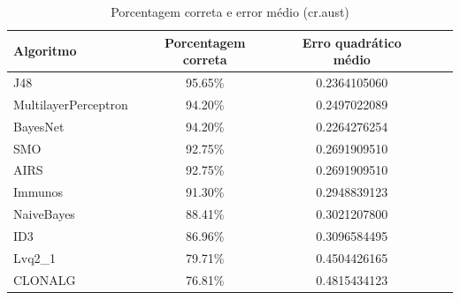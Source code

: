 \begin{table}[h]
    \centering
    \caption{Porcentagem correta e error médio (cr.aust)}
    \label{tbl:dev_table_aust_correct}
    \label{tbl:dev_table_first}
    \vspace{0.5cm}
    \begin{tabular}{|l|c|c|c|c|}
        \hline
        \textbf{Algoritmo} & \textbf{Porcentagem correta} & \textbf{Erro quadrático médio} \\
        \hline
        \rowcolor[gray]{.9}
        J48                  & 95.65\% & 0.2364105060 \\ \hline
        \rowcolor[gray]{.9}
        MultilayerPerceptron & 94.20\% & 0.2497022089 \\ \hline
        \rowcolor[gray]{.9}
        BayesNet             & 94.20\% & 0.2264276254 \\ \hline
        SMO                  & 92.75\% & 0.2691909510 \\ \hline
        AIRS                 & 92.75\% & 0.2691909510 \\ \hline
        Immunos              & 91.30\% & 0.2948839123 \\ \hline
        NaiveBayes           & 88.41\% & 0.3021207800 \\ \hline
        ID3                  & 86.96\% & 0.3096584495 \\ \hline
        Lvq2\_1              & 79.71\% & 0.4504426165 \\ \hline
        CLONALG              & 76.81\% & 0.4815434123 \\ \hline
    \end{tabular}
\end{table}

